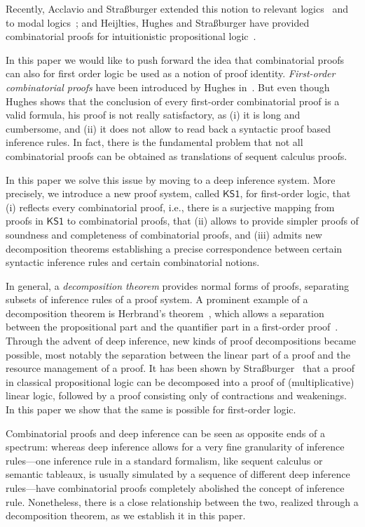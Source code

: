 \documentclass[conference,twosided,10pt]{IEEEtran}
\theoremstyle{definition}
\newcommand*{\FOKS}{\mathsf{KS1}}
\begin{document}
Recently, Acclavio and Stra\ss burger extended this notion to relevant
logics~\cite{acc:str:relevant} and to modal
logics~\cite{acc:str:modal}; and Heijlties, Hughes and Stra\ss burger
have provided combinatorial proofs for intuitionistic propositional
logic~\cite{HHS:lics19}.

In this paper we would like to push forward the idea that
combinatorial proofs can also for first order logic be used as a
notion of proof identity. \emph{First-order combinatorial proofs} have
been introduced by Hughes in~\cite{hughes:fopws}. But even though
Hughes shows that the conclusion of every first-order combinatorial
proof is a valid formula, his proof is not really satisfactory, as (i)
it is long and cumbersome, and (ii) it does not allow to read back a
syntactic proof based inference rules. In fact, there is the
fundamental problem that not all combinatorial proofs can be obtained
as translations of sequent calculus proofs.

In this paper we solve this issue by moving to a deep inference
system. More precisely, we introduce a new proof system, called
$\FOKS$, for first-order logic, that (i) reflects every combinatorial
proof, i.e., there is a surjective mapping from proofs in $\FOKS$ to
combinatorial proofs, that (ii) allows to provide simpler proofs of
soundness and completeness of combinatorial proofs, and (iii) admits
new decomposition theorems establishing a precise correspondence
between certain syntactic inference rules and certain combinatorial
notions.

In general, a \emph{decomposition theorem} provides normal forms of
proofs, separating subsets of inference rules of a proof system. A
prominent example of a decomposition theorem is Herbrand's
theorem~\cite{herbrand:phd}, which allows a separation between the
propositional part and the quantifier part in a first-order
proof~\cite{gentzen:35:II,brunnler:06:herbrand}. Through the advent of
deep inference, new kinds of proof decompositions became possible,
most notably the separation between the linear part of a proof and the
resource management of a proof. It has been shown by
Stra{\ss}burger~\cite{str:07:RTA} that a proof in classical
propositional logic can be decomposed into a proof of (multiplicative)
linear logic, followed by a proof consisting only of contractions and
weakenings. In this paper we show that the same is possible for
first-order logic.

Combinatorial proofs and deep inference can be seen as opposite ends
of a spectrum: whereas deep inference allows for a very fine
granularity of inference rules---one inference rule in a standard
formalism, like sequent calculus or semantic tableaux, is usually
simulated by a sequence of different deep inference rules---have
combinatorial proofs completely abolished the concept of inference
rule. Nonetheless, there is a close relationship between the two,
realized through a decomposition theorem, as we establish it in this
paper.
\end{document}
